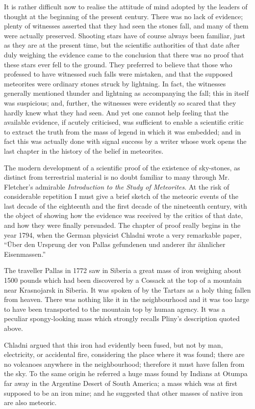 \documentclass[a4paper, 11pt, oneside]{article}
\begin{document}
It is rather difficult now to realise the attitude of mind adopted by the leaders of thought at the beginning of the present century. There was no lack of evidence; plenty of witnesses asserted that they had seen the stones fall, and many of them were actually preserved. Shooting stars have of course always been familiar, just as they are at the present time, but the scientific authorities of that date after duly weighing the evidence came to the conclusion that there was no proof that these stars ever fell to the ground. They preferred to believe that those who professed to have witnessed such falls were mistaken, and that the supposed meteorites were ordinary stones struck by lightning. In fact, the witnesses generally mentioned thunder and lightning as accompanying the fall; this in itself was suspicious; and, further, the witnesses were evidently so scared that they hardly knew what they had seen. And yet one cannot help feeling that the available evidence, if acutely criticised, was sufficient to enable a scientific critic to extract the truth from the mass of legend in which it was embedded; and in fact this was actually done with signal success by a writer whose work opens the last chapter in the history of the belief in meteorites. 

The modern development of a scientific proof of the existence of sky-stones, as distinct from terrestrial material is no doubt familiar to many through Mr. Fletcher's admirable \emph{Introduction to the Study of Meteorites}. At the risk of considerable repetition I must give a brief sketch of the meteoric events of the last decade of the eighteenth and the first decade of the nineteenth century, with the object of showing how the evidence was received by the critics of that date, and how they were finally persuaded. The chapter of proof really begins in the year 1794, when the German physicist Chladni wrote a very remarkable paper, ``Über den Ursprung der von Pallas gefundenen und anderer ihr ähnlicher Eisenmassen.'' 

The traveller Pallas in 1772 saw in Siberia a great mass of iron weighing about 1500 pounds which had been discovered by a Cossack at the top of a mountain near Krasnojarsk in Siberia. It was spoken of by the Tartars as a holy thing fallen from heaven. There was nothing like it in the neighbourhood and it was too large to have been transported to the mountain top by human agency. It was a peculiar spongy-looking mass which strongly recalls Pliny's description quoted above. 

Chladni argued that this iron had evidently been fused, but not by man, electricity, or accidental fire, considering the place where it was found; there are no volcanoes anywhere in the neighbourhood; therefore it must have fallen from the sky. To the same origin he referred a huge mass found by Indians at Otumpa far away in the Argentine Desert of South America; a mass which was at first supposed to be an iron mine; and he suggested that other masses of native iron are also meteoric. 
\end{document}
